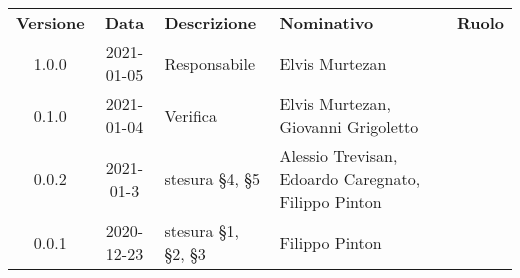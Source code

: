 
{
\renewcommand{\arraystretch}{1.5}
\centering
\begin{longtable}{ c c  C{3.5cm}  C{4cm}  c }
    \rowcolor{\primaryColor}
    \textcolor{\secondaryColor}{
    \textbf{Versione}}     & \textcolor{\secondaryColor}{\textbf{Data}}       & \textcolor{\secondaryColor}
    {\textbf{Descrizione}} & \textcolor{\secondaryColor}{\textbf{Nominativo}} & \textcolor{\secondaryColor}{\textbf{Ruolo}}                                                                         \\


    1.0.0                  & 2021-01-05                                       & Responsabile                                & Elvis Murtezan                                      & \responsabile{} \\

    0.1.0                  & 2021-01-04                                       & Verifica                                    & Elvis Murtezan, Giovanni Grigoletto                 & \verificatore{} \\

    0.0.2                  & 2021-01-3                                        & stesura §4, §5                              & Alessio Trevisan, Edoardo Caregnato, Filippo Pinton & \analista{}    \\

    0.0.1                  & 2020-12-23                                       & stesura §1, §2, §3                          & Filippo Pinton                                      & \analista{}    \\
\end{longtable}
}